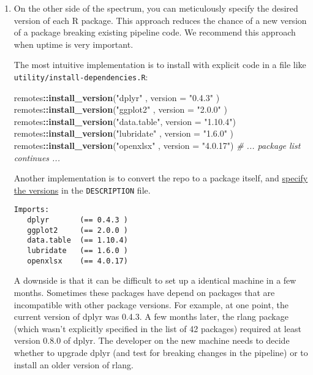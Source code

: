 \documentclass[
]{book}
\newenvironment{Shaded}{\begin{snugshade}}{\end{snugshade}}
\newcommand{\CommentTok}[1]{\textcolor[rgb]{0.56,0.35,0.01}{\textit{#1}}}
\newcommand{\DataTypeTok}[1]{\textcolor[rgb]{0.13,0.29,0.53}{#1}}
\newcommand{\KeywordTok}[1]{\textcolor[rgb]{0.13,0.29,0.53}{\textbf{#1}}}
\newcommand{\NormalTok}[1]{#1}
\newcommand{\OperatorTok}[1]{\textcolor[rgb]{0.81,0.36,0.00}{\textbf{#1}}}
\newcommand{\StringTok}[1]{\textcolor[rgb]{0.31,0.60,0.02}{#1}}
\begin{document}
\begin{enumerate}
\def\labelenumi{\arabic{enumi}.}
\item
  On the other side of the spectrum, you can meticulously specify the desired version of each R package. This approach reduces the chance of a new version of a package breaking existing pipeline code. We recommend this approach when uptime is very important.

  The most intuitive implementation is to install with explicit code in a file like \texttt{utility/install-dependencies.R}:

\begin{Shaded}
\begin{Highlighting}[]
\NormalTok{remotes}\OperatorTok{::}\KeywordTok{install\_version}\NormalTok{(}\StringTok{"dplyr"}\NormalTok{     , }\DataTypeTok{version =} \StringTok{"0.4.3"}\NormalTok{ )}
\NormalTok{remotes}\OperatorTok{::}\KeywordTok{install\_version}\NormalTok{(}\StringTok{"ggplot2"}\NormalTok{   , }\DataTypeTok{version =} \StringTok{"2.0.0"}\NormalTok{ )}
\NormalTok{remotes}\OperatorTok{::}\KeywordTok{install\_version}\NormalTok{(}\StringTok{"data.table"}\NormalTok{, }\DataTypeTok{version =} \StringTok{"1.10.4"}\NormalTok{)}
\NormalTok{remotes}\OperatorTok{::}\KeywordTok{install\_version}\NormalTok{(}\StringTok{"lubridate"}\NormalTok{ , }\DataTypeTok{version =} \StringTok{"1.6.0"}\NormalTok{ )}
\NormalTok{remotes}\OperatorTok{::}\KeywordTok{install\_version}\NormalTok{(}\StringTok{"openxlsx"}\NormalTok{  , }\DataTypeTok{version =} \StringTok{"4.0.17"}\NormalTok{)}
\CommentTok{\# ... package list continues ...}
\end{Highlighting}
\end{Shaded}

  Another implementation is to convert the repo to a package itself, and \href{http://r-pkgs.had.co.nz/description.html\#dependencies}{specify the versions} in the \texttt{DESCRIPTION} file.

\begin{verbatim}
Imports:
   dplyr       (== 0.4.3 )
   ggplot2     (== 2.0.0 )
   data.table  (== 1.10.4)
   lubridate   (== 1.6.0 )
   openxlsx    (== 4.0.17)
\end{verbatim}

  A downside is that it can be difficult to set up a identical machine in a few months. Sometimes these packages have depend on packages that are incompatible with other package versions. For example, at one point, the current version of dplyr was 0.4.3. A few months later, the rlang package (which wasn't explicitly specified in the list of 42 packages) required at least version 0.8.0 of dplyr. The developer on the new machine needs to decide whether to upgrade dplyr (and test for breaking changes in the pipeline) or to install an older version of rlang.


\end{enumerate}
\end{document}
